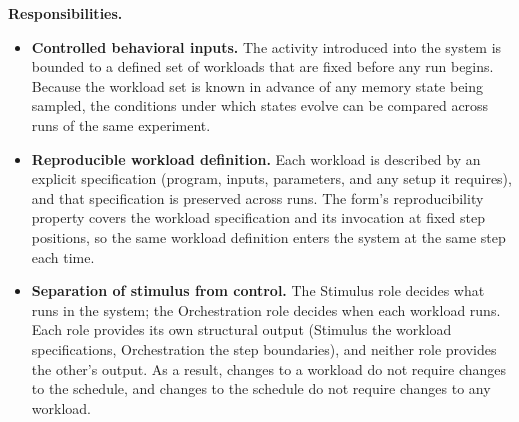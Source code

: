   \textbf{Responsibilities.}
  \begin{itemize}
    \item \textbf{Controlled behavioral inputs.} The activity introduced into the system is bounded to a defined set of workloads that are fixed before any run begins. Because the workload set is known in advance of any memory state being sampled, the conditions under which states evolve can be compared across runs of the same experiment.
    \item \textbf{Reproducible workload definition.} Each workload is described by an explicit specification (program, inputs, parameters, and any setup it requires), and that specification is preserved across runs. The form's reproducibility property covers the workload specification and its invocation at fixed step positions, so the same workload definition enters the system at the same step each time.
    \item \textbf{Separation of stimulus from control.} The Stimulus role decides what runs in the system; the Orchestration role decides when each workload runs. Each role provides its own structural output (Stimulus the workload specifications, Orchestration the step boundaries), and neither role provides the other's output. As a result, changes to a workload do not require changes to the schedule, and changes to the schedule do not require changes to any workload.
  \end{itemize}

